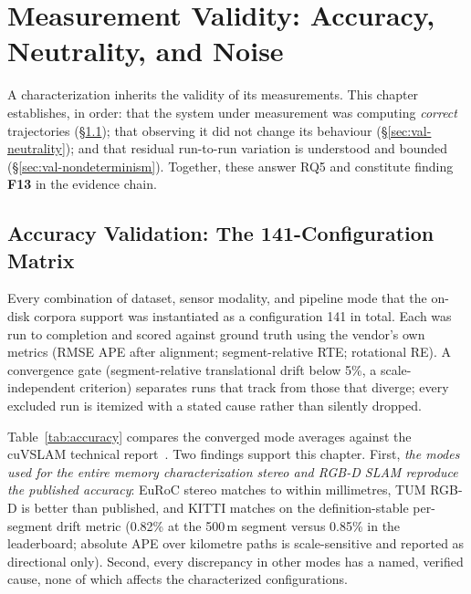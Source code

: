 \chapter{Measurement Validity: Accuracy, Neutrality, and Noise}
\label{ch:validity}

A characterization inherits the validity of its measurements. This chapter establishes, in order: that the system under measurement was computing \emph{correct} trajectories (\S\ref{sec:val-accuracy}); that observing it did not change its behaviour (\S\ref{sec:val-neutrality}); and that residual run-to-run variation is understood and bounded (\S\ref{sec:val-nondeterminism}). Together, these answer RQ5 and constitute finding \textbf{F13} in the evidence chain.

\section{Accuracy Validation: The 141-Configuration Matrix}
\label{sec:val-accuracy}

Every combination of dataset, sensor modality, and pipeline mode that the on-disk corpora support was instantiated as a configuration 141 in total. Each was run to completion and scored against ground truth using the vendor's own metrics (RMSE APE after alignment; segment-relative RTE; rotational RE). A convergence gate (segment-relative translational drift below 5\%, a scale-independent criterion) separates runs that track from those that diverge; every excluded run is itemized with a stated cause rather than silently dropped.

Table~\ref{tab:accuracy} compares the converged mode averages against the cuVSLAM technical report~\cite{cuvslam2025}. Two findings support this chapter. First, \emph{the modes used for the entire memory characterization stereo and RGB-D SLAM reproduce the published accuracy}: EuRoC stereo matches to within millimetres, TUM RGB-D is better than published, and KITTI matches on the definition-stable per-segment drift metric (0.82\% at the 500\,m segment versus 0.85\% in the leaderboard; absolute APE over kilometre paths is scale-sensitive and reported as directional only). Second, every discrepancy in other modes has a named, verified cause, none of which affects the characterized configurations.

